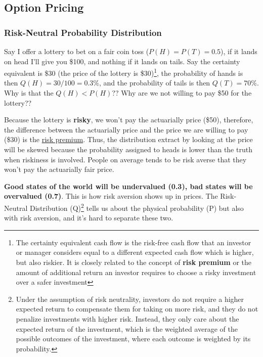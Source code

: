 \begin{multicols}{2}
\subsection{Option Pricing}
\subsubsection{Risk-Neutral Probability Distribution}
Say I offer a lottery to bet on a fair coin toss ($P(H)=P(T)=0.5$), if it lands on head I'll give you \$100, and nothing if it lands on tails. Say the certainty equivalent is \$30 (the price of the lottery is \$30)\footnote{The certainty equivalent cash flow is the risk-free cash flow that an investor or manager considers equal to a different expected cash flow which is higher, but also riskier. It is closely related to the concept of \textbf{risk premium} or the amount of additional return an investor requires to choose a risky investment over a safer investment}, the probability of hands is then $Q(H)=30/100 = 0.3\%$, and the probability of tails is then $Q(T) = 70\%$. Why is that the $Q(H)<P(H)$?? Why are we not willing to pay \$50 for the lottery??\par 

Because the lottery is \textbf{risky}, we won't pay the actuarially price (\$50), therefore, the difference between the actuarially price and the price we are willing to pay (\$30) is the \underline{risk premium}. Thus, the distribution extract by looking at the price will be skewed because the probability assigned to heads is lower than the truth when riskiness is involved. People on average tends to be risk averse that they won't pay the actuarially fair price.\par 

\textbf{Good states of the world will be undervalued (0.3), bad states will be overvalued (0.7)}. This is how risk aversion shows up in prices. The Risk-Neutral Distribution (Q)\footnote{Under the assumption of risk neutrality, investors do not require a higher expected return to compensate them for taking on more risk, and they do not penalize investments with higher risk. Instead, they only care about the expected return of the investment, which is the weighted average of the possible outcomes of the investment, where each outcome is weighted by its probability.} tells us about the physical probability (P) but also with risk aversion, and it's hard to separate these two. 


\end{multicols}
